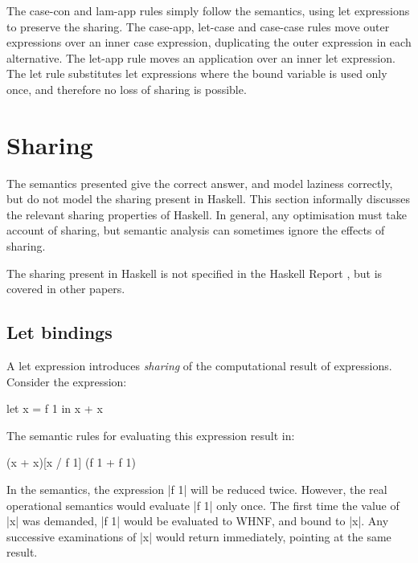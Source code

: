 The case-con and lam-app rules simply follow the semantics, using let expressions to preserve the sharing. The case-app, let-case and case-case rules move outer expressions over an inner case expression, duplicating the outer expression in each alternative. The let-app rule moves an application over an inner let expression. The let rule substitutes let expressions where the bound variable is used only once, and therefore no loss of sharing is possible.


\section{Sharing}
\label{sec:sharing}

The semantics presented give the correct answer, and model laziness correctly, but do not model the sharing present in Haskell. This section informally discusses the relevant sharing properties of Haskell. In general, any optimisation must take account of sharing, but semantic analysis can sometimes ignore the effects of sharing.

The sharing present in Haskell is not specified in the Haskell Report \cite{haskell}, but is covered in other papers.

\subsection{Let bindings}

A let expression introduces \textit{sharing} of the computational result of expressions. Consider the expression:

\begin{example}
\begin{code}
let x = f 1
in x + x
\end{code}

The semantic rules for evaluating this expression result in:

\begin{code}
(x + x)[x / f 1]
(f 1 + f 1)
\end{code}

In the semantics, the expression |f 1| will be reduced twice. However, the real operational semantics would evaluate |f 1| only once. The first time the value of |x| was demanded, |f 1| would be evaluated to WHNF, and bound to |x|. Any successive examinations of |x| would return immediately, pointing at the same result.
\end{example}

